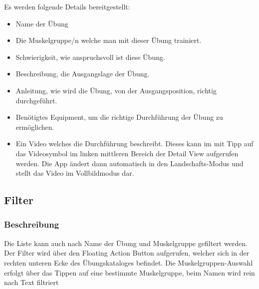 \documentclass[FIPLY_base.tex]{subfiles}
\begin{document}
Es werden folgende Details bereitgestellt:

\begin{itemize}
\item Name der Übung
\item Die Muskelgruppe/n welche man mit dieser Übung trainiert.
\item Schwierigkeit, wie anspruchsvoll ist diese Übung.
\item Beschreibung, die Ausgangslage der Übung.
\item Anleitung, wie wird die Übung, von der Ausgangsposition, richtig durchgeführt.
\item Benötigtes Equipment, um die richtige Durchführung der Übung zu ermöglichen.
\item Ein Video welches die Durchführung beschreibt. Dieses kann im mit Tipp auf das Videosymbol im linken mittleren Bereich der Detail View aufgerufen werden.
Die App ändert dann automatisch in den Landschafts-Modus und stellt das Video im Vollbildmodus dar.

\end{itemize}



\subsection{Filter}
\subsubsection{Beschreibung}
Die Liste kann auch nach Name der Übung und Muskelgruppe gefiltert werden. 
Der Filter wird über den Floating Action Button aufgerufen, welcher sich in der rechten unteren Ecke des Übungskataloges befindet.
Die Muskelgruppen-Auswahl erfolgt über das Tippen auf eine bestimmte Muskelgruppe, beim Namen wird rein nach Text filtriert
\end{document}
